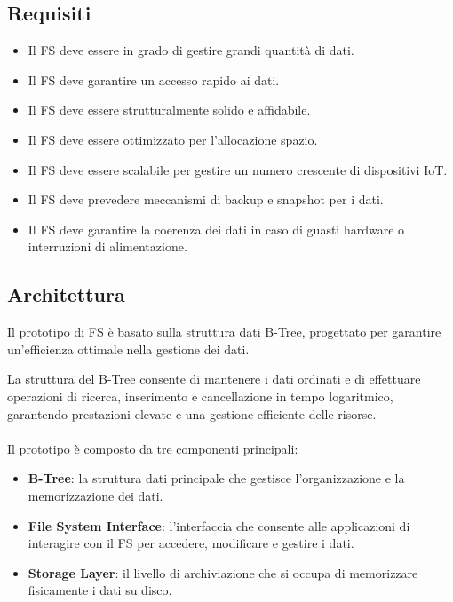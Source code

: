\documentclass[12pt,a4paper,openright,twoside]{book}
\begin{document}
        \subsection{Requisiti}

            \begin{itemize}
                \item Il \ac{FS} deve essere in grado di gestire grandi quantità di dati.
                \item Il \ac{FS} deve garantire un accesso rapido ai dati.
                \item Il \ac{FS} deve essere strutturalmente solido e affidabile.
                \item Il \ac{FS} deve essere ottimizzato per l'allocazione spazio.
                \item Il \ac{FS} deve essere scalabile per gestire un numero crescente di dispositivi IoT.
                \item Il \ac{FS} deve prevedere meccanismi di backup e snapshot per i dati.
                \item Il \ac{FS} deve garantire la coerenza dei dati in caso di guasti hardware o interruzioni di alimentazione.
            \end{itemize}

        \subsection{Architettura}

            Il prototipo di \ac{FS} è basato sulla struttura dati B-Tree, progettato per garantire un'efficienza ottimale nella gestione dei dati.

            La struttura del B-Tree consente di mantenere i dati ordinati e di effettuare operazioni di ricerca, inserimento e cancellazione in tempo logaritmico, garantendo prestazioni elevate e una gestione efficiente delle risorse.

            \paragraph*{}

            Il prototipo è composto da tre componenti principali:

            \begin{itemize}
                \item \textbf{B-Tree}: la struttura dati principale che gestisce l'organizzazione e la memorizzazione dei dati.
                \item \textbf{File System Interface}: l'interfaccia che consente alle applicazioni di interagire con il \ac{FS} per accedere, modificare e gestire i dati.
                \item \textbf{Storage Layer}: il livello di archiviazione che si occupa di memorizzare fisicamente i dati su disco.
            \end{itemize}
\end{document}
